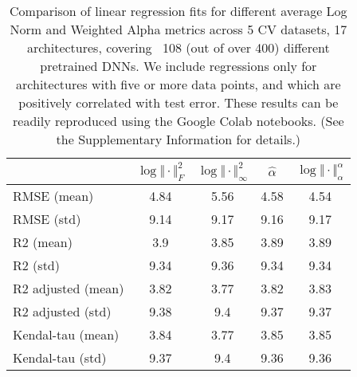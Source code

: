 
\begin{table}[t]
\small
\begin{center}
\begin{tabular}{|p{1.25in}|c|c|c|c|}
\hline
  & $\log\Vert\cdot\Vert^{2}_{F}$ & $\log\Vert\cdot\Vert^{2}_{\infty}$ & $\hat{\alpha}$ & $\log\Vert\cdot\Vert^{\alpha}_{\alpha}$ \\
\hline

RMSE (mean) & 4.84 & 5.56 & 4.58& 4.54 \\
RMSE (std) & 9.14 & 9.17 & 9.16& 9.17 \\
\hline
R2 (mean) & 3.9 & 3.85 & 3.89& 3.89 \\
R2 (std) & 9.34 & 9.36 & 9.34& 9.34 \\
\hline
R2 adjusted (mean) & 3.82 & 3.77 & 3.82& 3.83 \\
R2 adjusted (std) & 9.38 & 9.4 & 9.37& 9.37 \\
\hline
Kendal-tau (mean) & 3.84 & 3.77 & 3.85& 3.85 \\
Kendal-tau (std) & 9.37 & 9.4 & 9.36& 9.36 \\
\hline

\hline
\end{tabular}
\end{center}
\caption{Comparison of linear regression fits for different average Log Norm and Weighted Alpha metrics across 5 CV datasets, 17 architectures, covering \
108 (out of over 400) different pretrained DNNs.
         We include regressions only for architectures with five or more data points, and which are positively correlated with test error.
         These results can be readily reproduced using the Google Colab notebooks.
         (See the Supplementary Information
         for details.)}
\label{table:results}
\end{table}



